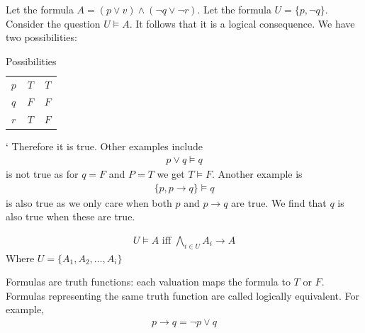 \documentclass[a4paper]{article}
\theoremstyle{plain}
\newtheorem{thm}{Theorem}[section]
\theoremstyle{definition}
\newtheorem{defn}{Definition}[section]
\newtheorem{exmp}{Example}[section]
\theoremstyle{remark}
\begin{document}
 \begin{tcolorbox}[colback=black!3!white,colframe=black!60!white,title=\begin{exmp}Propositional Consequence \label{Propositional Consequence}\end{exmp}]
         Let the formula $A = (p \lor v) \land (\neg q \lor \neg r)$. Let the formula $U = \{p, \neg q\}$. Consider the question $U \vDash A$.
	 It follows that it is a logical consequence. We have two possibilities:
	 \begin{table}[H]
	 	\centering
	 	\caption{Possibilities}
	 	\label{tab:label}
	 	\begin{tabular}{|c|c|c|}
			\hline
			$p$ & $T$ & $T$ \\
			$q$ & $F$ & $F$ \\
			$r$ & $T$ & $F$ \\
			\hline
	 	\end{tabular}
	 \end{table}
`	 Therefore it is true. Other examples include 
\begin{align*}
	p \lor q \vDash q
\end{align*}
is not true as for $q = F$ and $P = T$ we get $T \vDash F$. Another example is
\begin{align*}
	\{p, p\to q\} \vDash q
\end{align*}
is also true as we only care when both $p$ and $p\to q$ are true. We find that $q$ is also true when these are true.
 \end{tcolorbox}
 \begin{tcolorbox}[colback=black!3!white,colframe=black!60!white,title=\begin{thm}Connection of consequence and implication \label{Connection of consequence and implication}\end{thm}]
 		\begin{align}
 			U \vDash A \text{ iff } \bigwedge_{i \in U} A_i \to  A
 		\end{align}
 Where $U = \{A_1,A_2,\ldots,A_i\}$
 \end{tcolorbox}
\begin{tcolorbox}[colback=black!3!white,colframe=black!60!white,title=\begin{defn}Logical Equivalence \label{Logical Equivalence}\end{defn}]
Formulas are truth functions: each valuation maps the formula to $T$ or $F$. Formulas representing the same truth function are called logically equivalent. For example,
\begin{align}
p\to q = \neg p \lor q
\end{align}
\end{tcolorbox}
\end{document}

